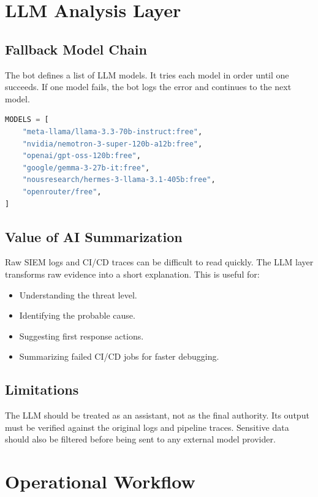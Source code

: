 \documentclass[12pt,a4paper]{report}
\begin{document}
\chapter{LLM Analysis Layer}

\section{Fallback Model Chain}

The bot defines a list of LLM models. It tries each model in order until one succeeds. If one model fails, the bot logs the error and continues to the next model.

\begin{lstlisting}[language=Python,caption={Model fallback list}]
MODELS = [
    "meta-llama/llama-3.3-70b-instruct:free",
    "nvidia/nemotron-3-super-120b-a12b:free",
    "openai/gpt-oss-120b:free",
    "google/gemma-3-27b-it:free",
    "nousresearch/hermes-3-llama-3.1-405b:free",
    "openrouter/free",
]
\end{lstlisting}

\section{Value of AI Summarization}

Raw SIEM logs and CI/CD traces can be difficult to read quickly. The LLM layer transforms raw evidence into a short explanation. This is useful for:

\begin{itemize}[leftmargin=*]
    \item Understanding the threat level.
    \item Identifying the probable cause.
    \item Suggesting first response actions.
    \item Summarizing failed CI/CD jobs for faster debugging.
\end{itemize}

\section{Limitations}

The LLM should be treated as an assistant, not as the final authority. Its output must be verified against the original logs and pipeline traces. Sensitive data should also be filtered before being sent to any external model provider.

\chapter{Operational Workflow}
\end{document}
